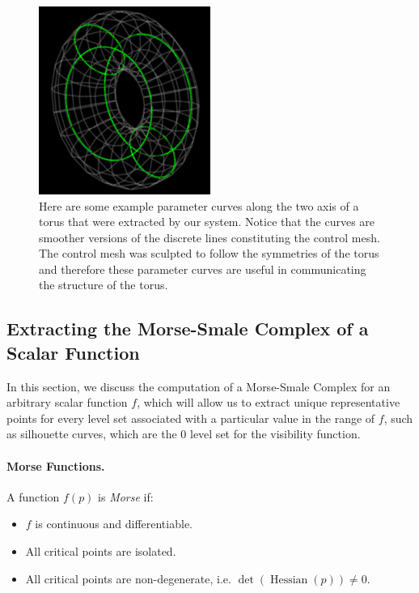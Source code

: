 \documentclass[12pt, letterpaper]{article}
\begin{document}
		\begin{figure}[h]
		\centering
		\includegraphics[width=0.5\textwidth]{Parameter_aligned_curves}
		\caption{Here are some example parameter curves along the two axis of a torus that were extracted by our system.
				Notice that the curves are smoother versions of the discrete lines constituting the control mesh.
				The control mesh was sculpted to follow the symmetries of the torus and therefore these parameter curves are
				useful in communicating the structure of the torus.}
		\label{fig:parameter_aligned_curves_torus}
		\end{figure}

	\newpage

	\subsection{Extracting the Morse-Smale Complex of a Scalar Function}
	\label{section:morse}
	
	In this section, we discuss the computation of a Morse-Smale Complex for an arbitrary scalar function $f$,
	which will allow us to extract unique representative points for every level set associated with a particular value in the range of $f$,
	such as silhouette curves, which are the 0 level set for the visibility function.

	\paragraph{Morse Functions.} A function $f(p)$ is \emph{Morse} if:

	\begin{itemize}
		\item $f$ is continuous and differentiable.
		\item All critical points are isolated.
		\item All critical points are non-degenerate, i.e. $\operatorname{det}(\operatorname{Hessian}(p))\ne 0$.
	\end{itemize}
\end{document}
